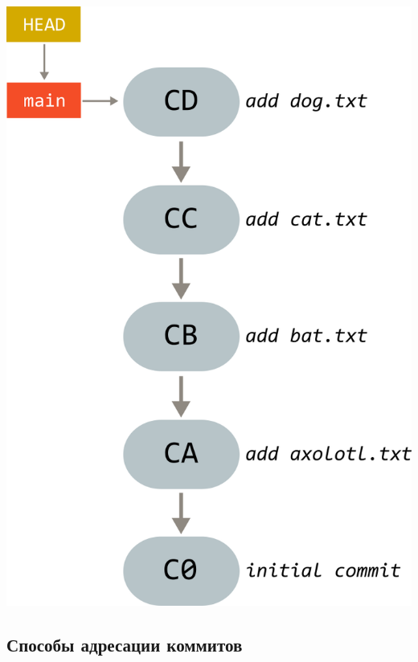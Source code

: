 \documentclass{article}
\begin{document}
\begin{minipage}{0.3\linewidth}
\begin{center}
\includegraphics[scale=0.8]{../images/animals.png}
\end{center}
\end{minipage}


\newpage
\subsection{Способы адресации коммитов}
\end{document}
